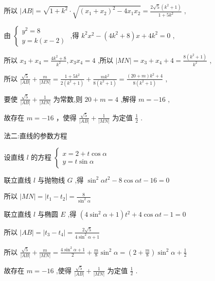 \documentclass[10pt]{article}
\begin{document}
所以 \(\left| {AB}\right|  = \sqrt{1 + {k}^{2}} \cdot  \sqrt{{\left( {x}_{1} + {x}_{2}\right) }^{2} - 4{x}_{1}{x}_{2}} = \frac{2\sqrt{5}\left( {{k}^{2} + 1}\right) }{1 + 5{k}^{2}}\) ,

由 \(\left\{  \begin{array}{l} {y}^{2} = 8 \\  y = k\left( {x - 2}\right)  \end{array}\right.\) ,得 \({k}^{2}{x}^{2} - \left( {4{k}^{2} + 8}\right) x + 4{k}^{2} = 0\) ,

所以 \({x}_{3} + {x}_{4} = \frac{4{k}^{2} + 8}{{k}^{2}},{x}_{3}{x}_{4} = 4\) ,所以 \(\left| {MN}\right|  = {x}_{3} + {x}_{4} + 4 = \frac{8\left( {{k}^{2} + 1}\right) }{{k}^{2}}\) ,

所以 \(\frac{\sqrt{5}}{\left| AB\right| } + \frac{m}{\left| MN\right| } = \frac{1 + 5{k}^{2}}{2\left( {{k}^{2} + 1}\right) } + \frac{m{k}^{2}}{8\left( {{k}^{2} + 1}\right) } = \frac{\left( {{20} + m}\right) {k}^{2} + 4}{8\left( {{k}^{2} + 1}\right) }\) ,

要使 \(\frac{\sqrt{5}}{\left| AB\right| } + \frac{1}{\left| MN\right| }\) 为常数,则 \({20} + m = 4\) ,解得 \(m =  - {16}\) ,

故存在 \(m =  - {16}\) ，使得 \(\frac{\sqrt{5}}{\left| AB\right| } + \frac{1}{\left| MN\right| }\) 为定值 \(\frac{1}{2}\) .

法二:直线的参数方程

设直线 \(l\) 的方程 \(\left\{  \begin{array}{l} x = 2 + t\cos \alpha \\  y = t\sin \alpha  \end{array}\right.\)

联立直线 \(l\) 与抛物线 \(G\) ,得 \({\sin }^{2}\alpha {t}^{2} - 8\cos {\alpha t} - {16} = 0\)

所以 \(\left| {MN}\right|  = \left| {{t}_{1} - {t}_{2}}\right|  = \frac{8}{{\sin }^{2}\alpha }\)

联立直线 \(l\) 与椭圆 \(E\) ,得 \(\left( {4{\sin }^{2}\alpha  + 1}\right) {t}^{2} + 4\cos {\alpha t} - 1 = 0\)

所以 \(\left| {AB}\right|  = \left| {{t}_{3} - {t}_{4}}\right|  = \frac{2\sqrt{5}}{4{\sin }^{2}\alpha  + 1}\)

所以 \(\frac{\sqrt{5}}{\left| AB\right| } + \frac{m}{\left| MN\right| } = \frac{4{\sin }^{2}\alpha  + 1}{2} + \frac{m}{8}{\sin }^{2}\alpha  = \left( {2 + \frac{m}{8}}\right) {\sin }^{2}\alpha  + \frac{1}{2}\)

故存在 \(m =  - {16}\) ,使得 \(\frac{\sqrt{5}}{\left| AB\right| } + \frac{1}{\left| MN\right| }\) 为定值 \(\frac{1}{2}\) .
\end{document}
